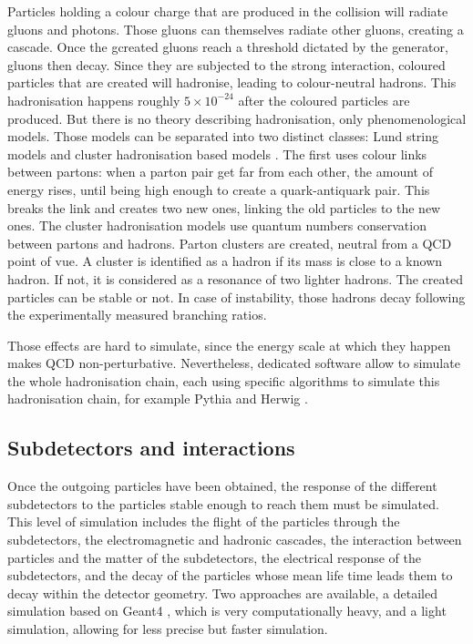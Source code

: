 Particles holding a colour charge that are produced in the collision will radiate gluons and photons. Those gluons can themselves radiate other gluons, creating a cascade. Once the gcreated gluons reach a threshold dictated by the generator, gluons then decay. Since they are subjected to the strong interaction, coloured particles that are created will hadronise, leading to colour-neutral hadrons. This hadronisation happens roughly $5 \times 10^{-24}$ after the coloured particles are produced. But there is no theory describing hadronisation, only phenomenological models. Those models can be separated into two distinct classes: Lund string models \cite{1983PhR....97...31A} and cluster hadronisation based models \cite{Winter2004}. The first uses colour links between partons: when a parton pair get far from each other, the amount of energy rises, until being high enough to create a quark-antiquark pair. This breaks the link and creates two new ones, linking the old particles to the new ones. The cluster hadronisation models use quantum numbers conservation between partons and hadrons.  Parton clusters are created, neutral from a QCD point of vue. A cluster is identified as a hadron if its mass is close to a known hadron. If not, it is considered as a resonance of two lighter hadrons. The created particles can be stable or not. In case of instability, those hadrons decay following the experimentally measured branching ratios.

Those effects are hard to simulate, since the energy scale at which they happen makes QCD non-perturbative. Nevertheless, dedicated software allow to simulate the whole hadronisation chain, each using specific algorithms to simulate this hadronisation chain, for example Pythia \cite{SJOSTRAND2008852} and Herwig \cite{Bellm2016}.

\subsection{Subdetectors and interactions}

Once the outgoing particles have been obtained, the response of the different subdetectors to the particles stable enough to reach them must be simulated. This level of simulation includes the flight of the particles through the subdetectors, the electromagnetic and hadronic cascades, the interaction between particles and the matter of the subdetectors, the electrical response of the subdetectors, and the decay of the particles whose mean life time leads them to decay within the detector geometry. Two approaches are available, a detailed simulation based on Geant4 \cite{AGOSTINELLI2003250}, which is very computationally heavy, and a light simulation, allowing for less precise but faster simulation.

